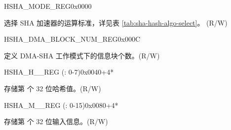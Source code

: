 \begin{register}{H}{SHA\_MODE\_REG}{0x0000}\label{regdesc:SHAMODEREG}
%
%
\regnewline%
\begin{regdesc}\begin{reglist}
\label{fielddesc:SHAMODE}\item [SHA\_MODE] 选择 SHA 加速器的运算标准，详见表 \ref{tab:sha-hash-algo-select}。 (R/W)
\end{reglist}\end{regdesc}
\end{register}



\begin{register}{H}{SHA\_DMA\_BLOCK\_NUM\_REG}{0x000C}\label{regdesc:SHADMABLOCKNUMREG}
%
%
\regnewline%
\begin{regdesc}\begin{reglist}
\label{fielddesc:SHADMABLOCKNUM}\item [SHA\_DMA\_BLOCK\_NUM] 定义 DMA-SHA 工作模式下的信息块个数。(R/W)
\end{reglist}\end{regdesc}
\end{register}

\begin{register}{H}{SHA\_H\_\_REG (: 0-7)}{0x0040+4*}\label{regdesc:SHAHNREG}
%
\regnewline%
\begin{regdesc}\begin{reglist}
\label{fielddesc:SHAH0}\item [SHA\_H\_\regindex{n}] 存储第  个 32 位哈希值。(R/W)
\end{reglist}\end{regdesc}
\end{register}


\begin{register}{H}{SHA\_M\_\_REG (: 0-15)}{0x0080+4*}\label{regdesc:SHAMNREG}
%
\begin{regdesc}\begin{reglist}
\label{fielddesc:SHAM0}\item [SHA\_M\_\regindex{n}] 存储第  个 32 位输入信息。(R/W)
\end{reglist}\end{regdesc}
\end{register}
